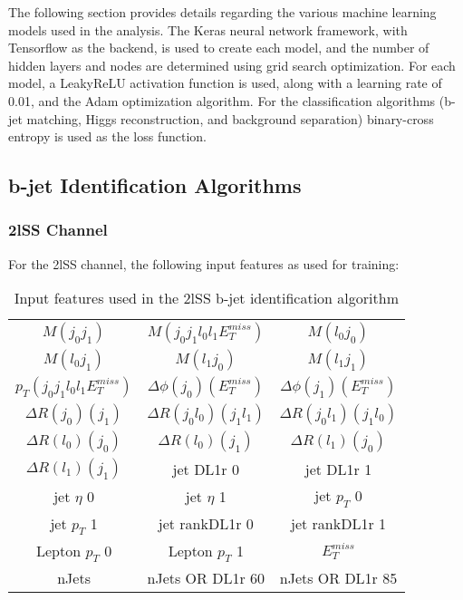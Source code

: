
The following section provides details regarding the various machine learning models used in the analysis. The Keras neural network framework, with Tensorflow as the backend, is used to create each model, and the number of hidden layers and nodes are determined using grid search optimization. For each model, a LeakyReLU activation function is used, along with a learning rate of 0.01, and the Adam optimization algorithm. For the classification algorithms (b-jet matching, Higgs reconstruction, and background separation) binary-cross entropy is used as the loss function. 

\subsection{b-jet Identification Algorithms}
\label{subsec:higgsRecoMVA}

\subsubsection{2lSS Channel}
\label{subsec:top2lSS}
                                                                                                                     
For the 2lSS channel, the following input features as used for training:

\begin{table}[h!]
  \begin{center}
  \begin{tabular}{ccc}
    $M(j_0j_1)$ & $M(j_0j_1l_0l_1E_T^{miss})$ & $M(l_0j_0)$ \\
    $M(l_0j_1)$ & $M(l_1j_0)$ & $M(l_1j_1)$ \\
    $p_T(j_0j_1l_0l_1E_T^{miss})$ & $\Delta\phi(j_0)(E_T^{miss})$ & $\Delta\phi(j_1)(E_T^{miss})$ \\
    $\Delta R(j_0)(j_1)$ & $\Delta R(j_0l_0)(j_1l_1)$ & $\Delta R(j_0l_1)(j_1l_0)$ \\
    $\Delta R(l_0)(j_0)$ & $\Delta R(l_0)(j_1)$ & $\Delta R(l_1)(j_0)$ \\
    $\Delta R(l_1)(j_1)$ & jet DL1r 0 & jet DL1r 1 \\
    jet  $\eta$ 0 & jet  $\eta$ 1 & jet  $p_T$ 0 \\
    jet  $p_T$ 1 & jet rankDL1r 0 & jet rankDL1r 1 \\
    Lepton  $p_T$ 0 & Lepton  $p_T$ 1 & $E_T^{miss}$ \\
    nJets & nJets OR DL1r 60 & nJets OR DL1r 85\\
  \end{tabular}
  \end{center}
  \caption{Input features used in the 2lSS b-jet identification algorithm}
  \label{tab:top2lSSfeatures}   
\end{table}

